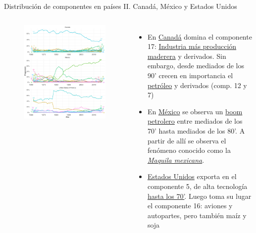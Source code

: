 \documentclass[compress]{beamer}
\begin{document}
\begin{frame}
\small
Distribución de componentes en países II. Canadá, México y Estados Unidos
\scriptsize
\begin{columns}[c] 

	\begin{figure}
		\includegraphics[width=\linewidth]{graficoLDA_k30_CAN_MEX_USA}
	\end{figure}
	
	
		\begin{itemize}[label=\faRebel]
		\item En \underline{Canadá} domina el componente 17: \underline{Industria más producción maderera} y derivados. Sin embargo, desde mediados de los 90' crecen en importancia el \underline{petróleo} y derivados (comp. 12 y 7)
		\item En \underline{México} se observa un \underline{boom petrolero} entre mediados de los 70' hasta mediados de los 80'. A partir de allí se observa el fenómeno conocido como la \underline{\textit{Maquila mexicana}}.
		\item \underline{Estados Unidos} exporta en el componente 5, de alta tecnología\underline{ hasta los 70'}. Luego toma su lugar el componente 16: aviones y autopartes, pero también maíz y soja
	\end{itemize}
	
\end{columns} 

\end{frame}
\end{document}
